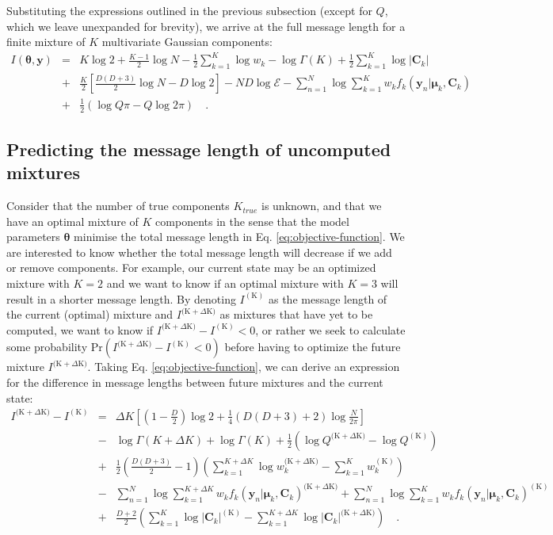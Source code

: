 \documentclass{article}
\newcommand{\vect}[1]{\boldsymbol{\mathbf{#1}}}
\def\veccov{\vect{C}}
\def\vecmean{\vect{\mu}}
\def\vectheta{\vect{\theta}}
\def\weight{w}
\def\weights{\vect{\weight}}
\def\datum{y}
\def\data{\vect{\datum}}
\def\current{^{\mathrm{(K)}}}
\def\future{^{\mathrm{(K} + \Delta\mathrm{K)}}}
\begin{document}
\noindent{}Substituting the expressions outlined in the previous subsection
(except for $Q$, which we leave unexpanded for brevity), we arrive at the full
message length for a finite mixture of $K$ multivariate Gaussian components:
\begin{eqnarray}
  I(\vectheta,\data) &=&
      K\log{2} %
    + \frac{K - 1}{2}\log{N} - \frac{1}{2}\sum_{k=1}^{K}\log\weight_k - \log{\Gamma(K)} %
    + \frac{1}{2}\sum_{k=1}^{K}\log{|\veccov_k|} \nonumber \\ %
   &+&\frac{K}{2}\left[\frac{D(D+3)}{2}\log{N} - D\log{2}\right] %
    - ND\log\mathcal{E} - \sum_{n=1}^{N}\log\sum_{k=1}^{K}w_{k}f_k(\data_n|\vecmean_k,\veccov_k) \nonumber \\ %
   &+& \frac{1}{2}\left(\log{Q\pi} - Q\log{2\pi}\right) \quad . %
    \label{eq:objective-function}
\end{eqnarray}


\subsection{Predicting the message length of uncomputed mixtures}


Consider that the number of true components $K_{true}$ is unknown, and that we
have an optimal mixture of $K$ components in the sense that the model
parameters $\vectheta$ minimise the total message length in Eq.
\ref{eq:objective-function}.  We are interested to know whether the total
message length will decrease if we add or remove components.  For
example, our current state may be an optimized mixture with $K=2$ and we want
to know if an optimal mixture with $K=3$ will result in a shorter message
length.  By denoting $I\current$ as the message length of the current (optimal) 
mixture and $I\future$ as mixtures that have yet to be computed, we
want to know if $I\future - I\current < 0$, or rather we seek to calculate 
some probability $\textrm{Pr}(I\future - I\current < 0)$ before having to 
optimize the future mixture $I\future$.  
Taking Eq. \ref{eq:objective-function}, we can derive an expression for the 
difference in message lengths between future mixtures and the current state:
\begin{eqnarray}
  I\future - I\current &=& \Delta{K}\left[
  \left(1 - \frac{D}{2}\right)\log{2} + \frac{1}{4}\left(D(D+3)+2\right)\log\frac{N}{2\pi}\right] \nonumber \\
  &-& \log\Gamma(K+\Delta{K}) + \log\Gamma(K) + \frac{1}{2}\left(\log{Q\future} - \log{Q\current}\right) \nonumber \\
  &+& \frac{1}{2}\left(\frac{D(D+3)}{2} - 1\right)\left(\sum_{k=1}^{K+\Delta{K}}\log\weight_k\future - \sum_{k=1}^{K}\weight_k\current\right) \nonumber \\
  &-& \sum_{n=1}^{N}\log\sum_{k=1}^{K+\Delta{K}}\weight_{k}f_{k}(\data_n|\vecmean_k,\veccov_k)\future + \sum_{n=1}^{N}\log\sum_{k=1}^{K}\weight_{k}f_{k}(\data_n|\vecmean_k,\veccov_k)\current \nonumber \\
  &+& \frac{D + 2}{2}\left(\sum_{k=1}^{K}\log|\veccov_k|\current - \sum_{k=1}^{K + \Delta{K}}\log|\veccov_k|\future\right) \quad .
  \label{eq:delta_I}
\end{eqnarray}
\end{document}

